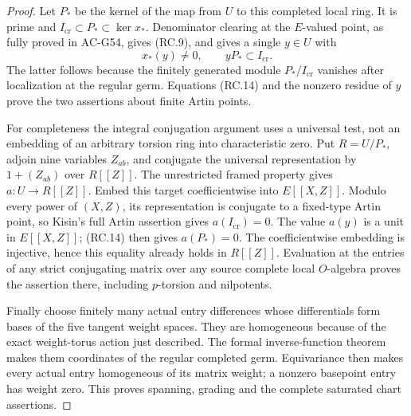 \begin{proof}
Let \(P_*\) be the kernel of the map from \(U\) to
this completed local ring.  It is prime and
\(I_{\mathrm{cr}}\subset P_*\subset\ker x_*\).
Denominator clearing at the \(E\)-valued point,
as fully proved in AC-G54, gives (RC.9), and gives
a single \(y\in U\) with
\[
           x_*(y)\ne0,\qquad yP_*\subset I_{\mathrm{cr}}.
 \tag{RC.14}
\]
The latter follows because the finitely generated
module \(P_*/I_{\mathrm{cr}}\) vanishes after
localization at the regular germ.  Equations
(RC.14) and the nonzero residue of \(y\) prove the
two assertions about finite Artin points.

For completeness the integral conjugation argument
uses a universal test, not an embedding of an
arbitrary torsion ring into characteristic zero.
Put \(R=U/P_*\), adjoin nine variables \(Z_{ab}\),
and conjugate the universal representation by
\(1+(Z_{ab})\) over \(R[[Z]]\).
The unrestricted framed property gives
\(a:U\to R[[Z]]\).
Embed this target coefficientwise into \(E[[X,Z]]\).
Modulo every power of \((X,Z)\), its representation
is conjugate to a fixed-type Artin point, so
Kisin's full Artin assertion gives \(a(I_{\mathrm{cr}})=0\).
The value \(a(y)\) is a unit in \(E[[X,Z]]\);
(RC.14) then gives \(a(P_*)=0\).
The coefficientwise embedding is injective, hence
this equality already holds in \(R[[Z]]\).
Evaluation at the entries of any strict conjugating
matrix over any source complete local \(O\)-algebra
proves the assertion there, including \(p\)-torsion
and nilpotents.

Finally choose finitely many actual entry differences
whose differentials form bases of the five tangent
weight spaces.  They are homogeneous because of
the exact weight-torus action just described.
The formal inverse-function theorem makes them
coordinates of the regular completed germ.
Equivariance then makes every actual entry
homogeneous of its matrix weight; a nonzero
basepoint entry has weight zero.
This proves spanning, grading and the complete
saturated chart assertions.
\end{proof}

